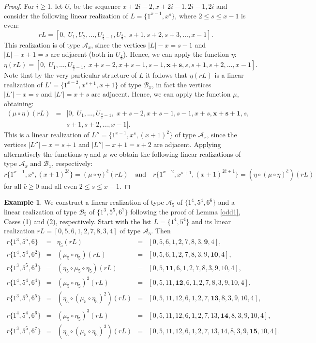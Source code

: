 \documentclass{amsart}
\theoremstyle{definition}
\newtheorem{ex}[prop]{Example}
\numberwithin{equation}{section}
\def\A{\mathcal{A}}
\def\B{\mathcal{B}}
\def\equad{\quad \textrm{and} \quad}
\begin{document}
\begin{proof}
For $i\geq 1$, let $U_i$ be the sequence $x+2i-2, x+2i-1, 2i-1, 2i$ and  consider the following linear
realization of $L=\{1^{x-1}, x^s\}$, where $2\leq s\leq x-1$ is even:
$$rL=[0,\; U_1,U_2,\ldots,U_{\frac{s}{2}-1}, U_{\frac{s}{2}},\; s+1, s+2, s+3,\ldots,x-1].$$
This realization is  of type $\A_x$, since the vertices $|L|-x = s-1$ and $|L|-x + 1=s$ are adjacent (both in $U_\frac{s}{2}$).
Hence, we can apply the function $\eta$:
$$ \eta(rL ) = [0,\; U_1,\ldots,U_{\frac{s}{2}-1},\; x+s-2, x+s-1, s-1, \bm{x+s}, s,s+1,s+2,\ldots,x-1].$$
Note that by the very particular structure of $L$ it follows that $\eta(rL)$ is a linear realization
of $L'=\{1^{x-2}, x^{s+1}, x+1\}$ of type $\B_x$, in fact the vertices $|L'|-x=s$ and
$|L'|=x+s$ are adjacent.
Hence, we can apply the function $\mu$, obtaining:
$$\begin{array}{rcl}
(\mu\circ\eta)(rL ) &= & [0,\; U_1,\ldots,U_{\frac{s}{2}-1},\; x+s-2, x+s-1, s-1, x+s, \bm{x+s+1},s,\\
&&s+1,s+2,\ldots,x-1].
\end{array}$$
This is a linear realization  of $L''=\{1^{x-1}, x^{s}, (x+1)^2\}$ of type $\A_x$, since
the vertices $|L''|-x=s+1$ and $|L''|-x+1=s+2$ are adjacent.
Applying alternatively the functions $\eta$ and $\mu$ we obtain the following linear realizations of type $\A_x$ and $\B_x$, respectively:
$$r\{1^{x-1}, x^s, (x+1)^{2\bar c} \}=(\mu \circ \eta)^{\bar c} (rL)\equad r\{1^{x-2}, x^{s+1}, (x+1)^{2\bar
c+1}\}=(\eta\circ(\mu\circ\eta)^{\bar c} )(rL )$$
for all $\bar c\geq 0$ and all even $2\leq s\leq x-1$.
\end{proof}


\begin{ex}
We construct a linear realization of  type $\A_5$ of $\{1^4,5^4,6^6\}$ and
a linear realization of type $\B_5$ of $\{1^3,5^5,6^7\}$ following the proof of Lemma \ref{odd1}, Cases (1) and (2), respectively.
Start with the list $L=\{1^4,5^4\}$ and its linear realization $rL=[0,5,6,1,2,7,8,3,4]$ of type $\A_5$. Then
$$\begin{array}{rcccl}
r\{1^3,5^5,6\} & = & \eta_5(rL) & =& [0,5,6,1,2,7,8,3,\bm{9},4], \\
r\{1^4,5^4,6^2\} & = & (\mu_5\circ\eta_5)(rL) & =& [0,5,6,1,2,7,8,3,9,\bm{10},4], \\
r\{1^3,5^5,6^3\} & = & (\eta_5\circ\mu_5\circ\eta_5)(rL) & =& [0,5,\bm{11}, 6,1,2,7,8,3,9,10,4], \\
r\{1^4,5^4,6^4\} & = & (\mu_5\circ\eta_5)^2(rL) & =& [0,5,11,\bm{12},6,1,2,7,8,3,9,10,4], \\
r\{1^3,5^5,6^5\} & = & (\eta_5\circ(\mu_5\circ\eta_5)^2)(rL) & =& [0, 5,11,12,6, 1,2, 7,\bm{13},8,3,9,10,4], \\
r\{1^4,5^4,6^6\} & = & (\mu_5\circ\eta_5)^3(rL) & =& [0, 5,11,12,6, 1,2, 7,13,\bm{14},8,3,9,10,4], \\
 r\{1^3,5^5,6^7\} & = & (\eta_5\circ(\mu_5\circ\eta_5)^3)(rL) & =& [0, 5,11,12,6, 1,2, 7,13,14,8,3,9,\bm{15},10,4].
\end{array}$$
\end{ex}
\end{document}
